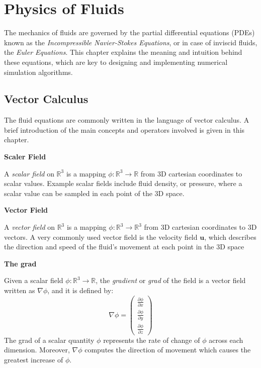 \chapter{Physics of Fluids}
\label{chapter physics}

The mechanics of fluids are governed by the partial differential equations (PDEs) known as the \textit{Incompressible Navier-Stokes Equations}, or in case of inviscid fluids, the \textit{Euler Equations}. This chapter explains the meaning and intuition behind these equations, which are key to designing and implementing numerical simulation algorithms.

\section{Vector Calculus}
The fluid equations are commonly written in the language of vector calculus. A brief introduction of the main concepts and operators involved is given in this chapter. 


\gapM

\textbf{Scaler Field}

\gapS

A \textit{scalar field} on $ \mathbb{R} ^3 $ is a mapping $\phi : \mathbb{R} ^3 \rightarrow \mathbb{R} $ from 3D cartesian coordinates to scalar values. Example scalar fields include fluid density, or pressure, where a scalar value can be sampled in each point of the 3D space.

\gapM

\textbf{Vector Field}

\gapS

A \textit{vector field} on $ \mathbb{R} ^3 $ is a mapping $\phi : \mathbb{R} ^3 \rightarrow \mathbb{R} ^3 $ from 3D cartesian coordinates to 3D vectors. A very commonly used vector field is the velocity field $\textbf{u}$, which describes the direction and speed of the fluid's movement at each point in the 3D space


\gapM

\textbf{The grad}

\gapS

Given a scalar field $\phi : \mathbb{R} ^3 \rightarrow \mathbb{R} $, the \textit{gradient} or \textit{grad} of the field is a vector field written as $\nabla \phi$, and it is defined by:
\begin{equation*}
    \nabla \phi = 
    \left(
    \begin{aligned}
        \frac{\partial \phi}{\partial x} \\
        \frac{\partial \phi}{\partial y} \\
        \frac{\partial \phi}{\partial z}
    \end{aligned} \right)
\end{equation*} 
The grad of a scalar quantity $\phi$ represents the rate of change of $\phi$ across each dimension. Moreover, $\nabla \phi$ computes the direction of movement which causes the greatest increase of $\phi$. 

